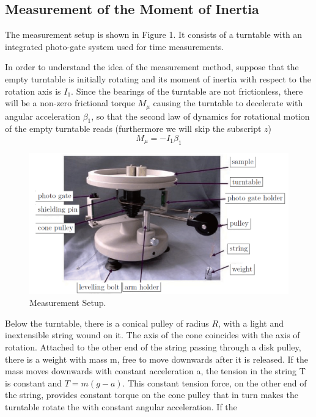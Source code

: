 \documentclass[12pt]{article}
\begin{document}
\subsection{Measurement of the Moment of Inertia}
The measurement setup is shown in Figure 1. It consists of a turntable with an integrated photo-gate system used for time measurements.
\par In order to understand the idea of the measurement method, suppose that the empty
turntable is initially rotating and its moment of inertia with respect to the rotation axis
is $I_1$. Since the bearings of the turntable are not frictionless, there will be a non-zero
frictional torque $M_\mu$ causing the turntable to decelerate with angular acceleration $\beta_1$,
so that the second law of dynamics for rotational motion of the empty turntable reads
(furthermore we will skip the subscript $\mathit{z}$)
\begin{equation}
M_\mu =-I_1\beta_1    
\end{equation} 
\begin{figure}[H]
\centering
\includegraphics[width=1\linewidth]{setup.jpg}
\caption{\label{fig:measurement setup}Measurement Setup.}
\end{figure}
\par Below the turntable, there is a conical pulley of radius $R$, with a light and inextensible
string wound on it. The axis of the cone coincides with the axis of rotation. Attached to
the other end of the string passing through a disk pulley, there is a weight with mass m,
free to move downwards after it is released. If the mass moves downwards with constant
acceleration a, the tension in the string T is constant and $T = m(g-\mathit{a})$. This constant
tension force, on the other end of the string, provides constant torque on the cone pulley
that in turn makes the turntable rotate the with constant angular acceleration. If the
\end{document}
